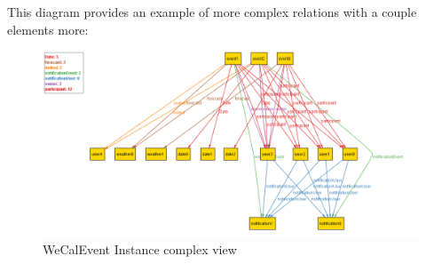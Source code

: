 \newpage
This diagram provides an example of more complex relations with a couple elements more:\\


\begin{figure}[tbh]
  \begin{center}
  \includegraphics[width=180mm]{complex}
    \caption{WeCalEvent Instance complex view}\label{Fig :}
  \end{center}
\end{figure} 